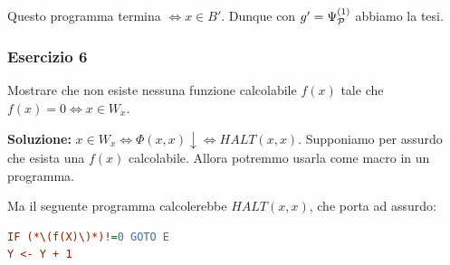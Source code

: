 Questo programma termina \(\iff x \in B'\). Dunque con \(g'=\Psi_{\mathcal{P}}^{(1)}\) abbiamo la tesi.

\subsubsection{Esercizio 6}

Mostrare che non esiste nessuna funzione calcolabile \(f(x)\) tale che \(f(x)=0 \iff x \in W_x\).

\textbf{Soluzione:} \(x \in W_x \iff \Phi(x,x) \downarrow \iff \textit{HALT}(x,x)\). Supponiamo per assurdo che esista una \(f(x)\) calcolabile. Allora potremmo usarla come macro in un programma.

Ma il seguente programma calcolerebbe \(\textit{HALT}(x,x)\), che porta ad assurdo:

\begin{lstlisting}[language=ini, caption={ }]
IF (*\(f(X)\)*)!=0 GOTO E
Y <- Y + 1
\end{lstlisting}
